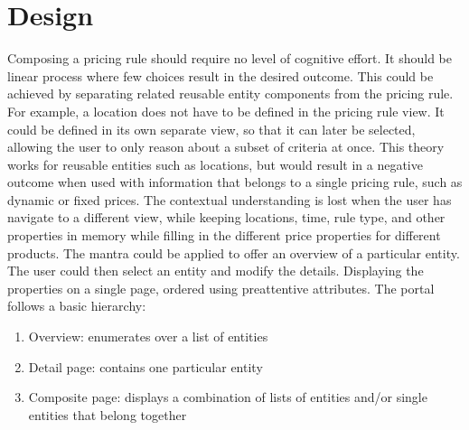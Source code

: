 \section{Design}
Composing a pricing rule should require no level of cognitive effort. It should be linear process where few choices result in the desired outcome. This could be achieved by separating related reusable entity components from the pricing rule. For example, a location does not have to be defined in the pricing rule view. It could be defined in its own separate view, so that it can later be selected, allowing the user to only reason about a subset of criteria at once. This theory works for reusable entities such as locations, but would result in a negative outcome when used with information that belongs to a single pricing rule, such as dynamic or fixed prices. The contextual understanding is lost when the user has navigate to a different view, while keeping locations, time, rule type, and other properties in memory while filling in the different price properties for different products. The mantra could be applied to offer an overview of a particular entity. The user could then select an entity and modify the details. Displaying the properties on a single page, ordered using preattentive attributes. The portal follows a basic hierarchy:

\begin{enumerate}
	\item Overview: enumerates over a list of entities
	\item Detail page: contains one particular entity
	\item Composite page: displays a combination of lists of entities and/or single entities that belong together
\end{enumerate}

